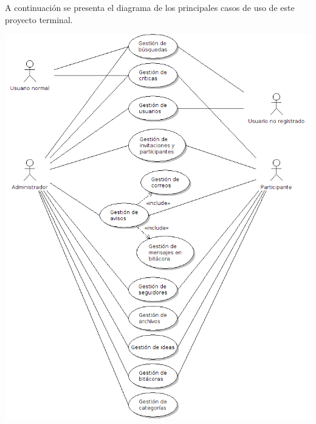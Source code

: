 \documentclass[11pt,letterpaper,titlepage]{article}
\begin{document}
A continuaci\'on se presenta el diagrama de los principales casos de uso de este proyecto terminal.
\begin{center}
\includegraphics[width=380pt]{casos1.png}
\end{center}
\end{document}
